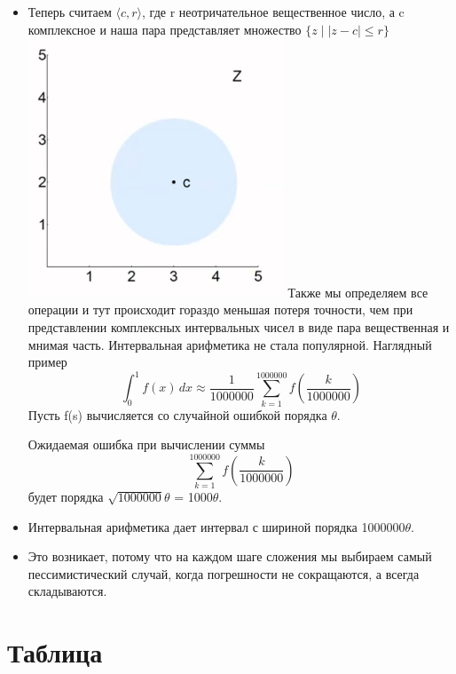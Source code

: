 \documentclass{article}
\begin{document}
\begin{itemize}
\item[] Теперь считаем $\langle c, r \rangle$, где r неотричательное вещественное число, а c комплексное и наша пара представляет
множество $\{ z \mid |z - c| \leq r \}$
\includegraphics[width=0.6\textwidth, keepaspectratio]{./images/ball_arithm.png}
Также мы определяем все операции и тут происходит гораздо меньшая потеря точности, чем при представлении комплексных
интервальных чисел в виде пара вещественная и мнимая часть.
Интервальная арифметика не стала популярной. Наглядный пример
\[
\int_0^1 f(x)\,dx \approx \frac{1}{1000000} \sum_{k=1}^{1000000} f\left(\frac{k}{1000000}\right)
\]
Пусть f(s) вычисляется со случайной ошибкой порядка $\theta$.

Ожидаемая ошибка при вычислении суммы
\[
\sum_{k=1}^{1000000} f\left(\frac{k}{1000000}\right)
\]
будет порядка $\sqrt{1000000}\theta$ = 1000$\theta$.

\item[] Интервальная арифметика дает интервал с шириной порядка 1000000$\theta$.

\item[] Это возникает, потому что на каждом шаге сложения мы выбираем самый пессимистический случай, когда погрешности не сокращаются,
а всегда складываются.

\end{itemize} 

\section{Таблица}
\paragraph{}
\end{document}
